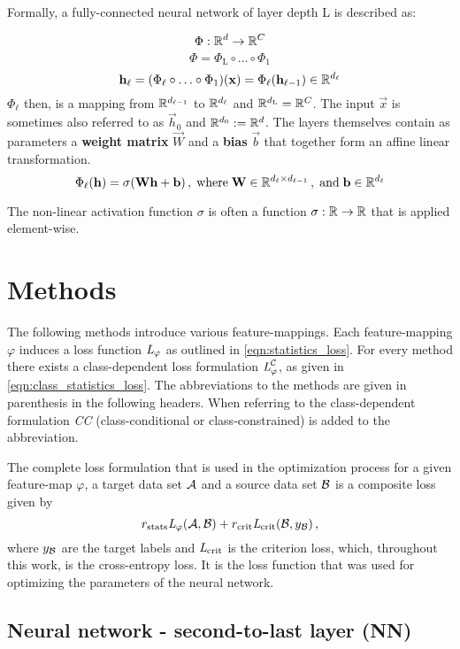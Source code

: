 Formally, a fully-connected neural network of layer depth L is described as:

\[
    \Phi : \mathbb{R}^d \to \mathbb{R}^C
\]
\[
    \Phi = \Phi_\text{L} \circ \ldots \circ \Phi_1
\]
\[
    \mathbf h_\ell = (\Phi_\ell \circ \ldots \circ \Phi_1) (\mathbf x) =
    \Phi_\ell(\mathbf h_{\ell-1}) \in \mathbb{R}^{d_\ell}
\]
$\Phi_\ell$ then, is a mapping from $\mathbb{R}^{d_{\ell-1}}$ to $\mathbb{R}^{d_\ell}$ and $\mathbb{R}^{d_\textnormal{L}} = \mathbb{R}^C$.
The input $\vec x$ is sometimes also referred to as $\vec h_0$ and $\mathbb{R}^{d_0} := \mathbb{R}^d$.
The layers themselves contain as parameters a \textbf{weight matrix} $\vec W$ and a \textbf{bias} $\vec b$
that together form an affine linear transformation.
\[
    \Phi_\ell(\mathbf h) = \sigma (\mathbf W \mathbf h + \mathbf b) \,, \; \text{where} \;
    \mathbf W \in \mathbb{R}^{d_\ell \times d_{\ell-1}} \,, \; \text{and} \;
    \mathbf b \in \mathbb{R}^{d_\ell}
\]

The non-linear activation function $\sigma$ is often a function $\sigma:\mathbb{R}\to\mathbb{R}$ that is applied element-wise.



\section{Methods}
\label{sec:methods}

The following methods introduce various feature-mappings.
Each feature-mapping $\varphi$ induces a loss function $\textit{L}_\varphi$ as outlined in \ref{eqn:statistics_loss}.
For every method there exists a class-dependent loss formulation $\textit{L}_\varphi^{\mathcal C}$,
as given in \ref{eqn:class_statistics_loss}.
The abbreviations to the methods are given in parenthesis in the following headers. 
When referring to the class-dependent formulation \textit{CC} (class-conditional or
class-constrained) is added to the abbreviation.

The complete loss formulation that is used in the optimization process 
for a given feature-map $\varphi$, a target data set $\mathcal A$ and a source data set $\mathcal B$ 
is a composite loss given by
\[
    r_\text{stats}\textit{L}_\varphi(\mathcal A, \mathcal B) + r_\text{crit}\textit{L}_\text{crit}(\mathcal B, y_{\mathcal B}) \,,
\]
where $y_{\mathcal B}$ are the target labels and $\textit{L}_\text{crit}$ is the criterion loss, which, throughout this work, is the cross-entropy loss.
It is the loss function that was used for optimizing the parameters of the neural network.



\subsection{Neural network - second-to-last layer (NN)}

